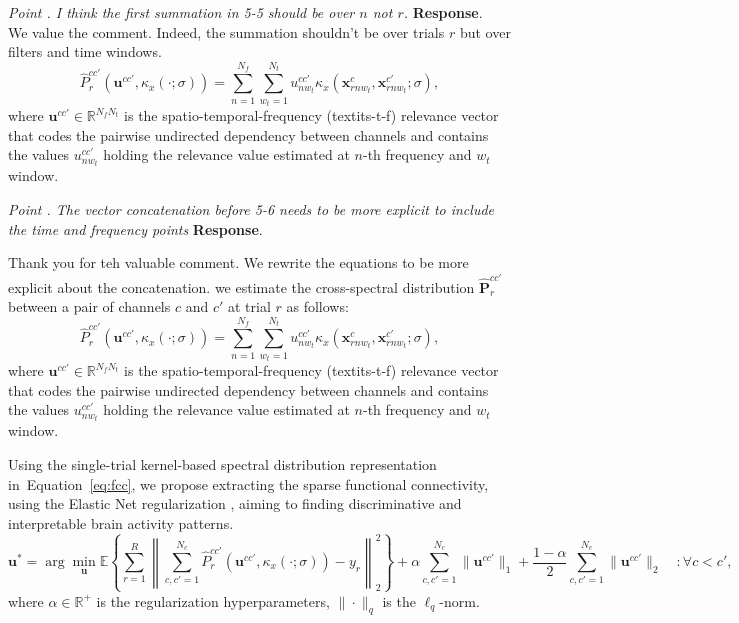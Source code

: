 \documentclass[runningheads]{llncs}
\providecommand{\promed}[1]{{\mathbb{E}}\left\lbrace #1\right\rbrace}%
\newcommand{\Real}{\mathbb{R}}
\newcommand{\ve}[1]{\bm {#1}}
\newcommand{\mat}[1]{\bm {#1}}
\newenvironment{reviewer}{\setcounter{pointcounter}{1}}{}
\newcommand{\changes}[1]{\textcolor[rgb]{1.00,0.00,0.00}{#1}}
\newcommand{\point}[1]{\medskip \noindent
 \textsl{{\fontseries{b}\selectfont Point \thepointcounter}.
 \stepcounter{pointcounter} #1}}
\newcommand{\reply}{\medskip \noindent \textbf{Response}.\ }
\begin{document}
\begin{reviewer}
\point{I think the first summation in 5-5 should be over $n$ not $r$.}
\reply{
    We value the comment. Indeed, the summation shouldn't be over trials $r$ but over filters and time windows.
    \changes{
        \begin{equation}\label{eq:fcc}
            \hat{P}^{cc'}_{r}(\ve{u}^{cc'},\kappa_x\left(\cdot;\sigma\right)) = \sum_{n=1}^{N_f}\sum_{w_t=1}^{N_t} u_{nw_t}^{cc'}\kappa_x\left(\ve{x}^{c}_{rnw_t},\ve{x}^{c'}_{rnw_t};\sigma\right),
        \end{equation}
        where $\ve{u}^{cc'} \in \Real^{N_f N_t}$ is the spatio-temporal-frequency (textit{s-t-f}) relevance vector that codes the pairwise undirected dependency between channels and contains the values $u_{nw_t}^{cc'}$ holding the relevance value estimated at $n$-th frequency and $w_t$ window.
        }
}

\point{The vector concatenation before 5-6 needs to be more explicit to include the time and frequency points}
\reply{
        Thank you for teh valuable comment. We rewrite the equations to be more explicit about the concatenation.
    \changes{we estimate the cross-spectral distribution $\hat{\mat{P}}^{cc'}_{r}$ between a pair of channels $c$ and $c'$ at trial $r$ as follows:}
\changes{
\begin{equation}\label{eq:fcc}
	\hat{P}^{cc'}_{r}(\ve{u}^{cc'},\kappa_x\left(\cdot;\sigma\right)) = \sum_{n=1}^{N_f}\sum_{w_t=1}^{N_t} u_{nw_t}^{cc'}\kappa_x\left(\ve{x}^{c}_{rnw_t},\ve{x}^{c'}_{rnw_t};\sigma\right),
\end{equation}
where $\ve{u}^{cc'} \in \Real^{N_f N_t}$ is the spatio-temporal-frequency (textit{s-t-f}) relevance vector that codes the pairwise undirected dependency between channels and contains the values $u_{nw_t}^{cc'}$ holding the relevance value estimated at $n$-th frequency and $w_t$ window.
}

\changes{Using the single-trial kernel-based spectral distribution representation in~Equation~\eqref{eq:fcc}, we propose extracting the sparse functional connectivity, using the Elastic Net regularization \cite{tay2023elastic}, aiming to finding discriminative and interpretable brain activity patterns.
\begin{equation}\label{eq:SRC}
	\ve{u}^* = \arg \min_{\ve{u}} \promed{ \sum_{r=1}^{R} \left\|\sum_{c,c'=1}^{N_c}\hat{P}^{cc'}_{r}(\ve{u}^{cc'},\kappa_x(\cdot;\sigma))-y_r\right\|^2_2} + \alpha \sum_{c,c'=1}^{N_c}\|\ve{u}^{cc'}\|_1 + \frac{1-\alpha}{2} \sum_{c,c'=1}^{N_c}\|\ve{u}^{cc'}\|_2 \quad :  \forall c < c',
\end{equation}
where $\alpha \in \Real^+$ is the regularization hyperparameters, $\| \cdot \|_q$ is the $\ell_q$-norm.
}

}
\end{reviewer}
\end{document}
